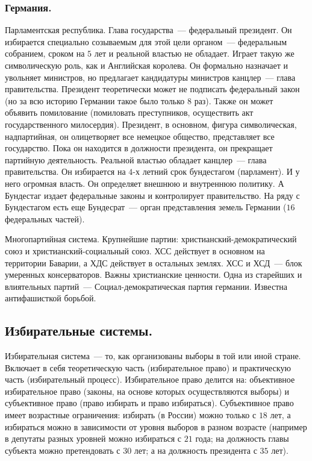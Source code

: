 \documentclass[12pt]{article}
\begin{document}
	\subsubsection{Германия.}
	\begin{note}
		Парламентская республика. Глава государства~--- федеральный президент. Он избирается специально созываемым для этой цели органом~--- федеральным собранием, сроком на $5$ лет и реальной властью не обладает. Играет такую же символическую роль, как и Английская королева. Он формально назначает и увольняет министров, но предлагает кандидатуры министров канцлер~--- глава правительства. Президент теоретически может не подписать федеральный закон (но за всю историю Германии такое было только $8$ раз). Также он может объявить помилование (помиловать преступников, осуществить акт государственного милосердия). Президент, в основном, фигура символическая, надпартийная, он олицетворяет все немецкое общество, представляет все государство. Пока он находится в должности президента, он прекращает партийную деятельность. Реальной властью обладает канцлер~--- глава правительства. Он избирается на $4$-х летний срок бундестагом (парламент). И у него огромная власть. Он определяет внешнюю и внутреннюю политику. А Бундестаг издает федеральные законы и контролирует правительство. На ряду с Бундестагом есть еще Бундесрат~--- орган представления земель Германии ($16$ федеральных частей).
	\end{note}
	\begin{note}
		Многопартийная система. Крупнейшие партии: христианский-демократический союз и христианский-социальный союз. ХСС действует в основном на территории Баварии, а ХДС действует в остальных землях. ХСС и ХСД~--- блок умеренных консерваторов. Важны христианские ценности. Одна из старейших и влиятельных партий~--- Социал-демократическая партия германии. Известна антифашисткой борьбой.
	\end{note}
	\subsection{Избирательные системы.}
	\begin{definition}
		Избирательная система~--- то, как организованы выборы в той или иной стране. Включает в себя теоретическую часть (избирательное право) и практическую часть (избирательный процесс). Избирательное право делится на: объективное избирательное право (законы, на основе которых осуществляются выборы) и субъективное право (право избирать и право избираться). Субъективное право имеет возрастные ограничения: избирать (в России) можно только с $18$ лет, а избираться можно в зависимости от уровня выборов в разном возрасте (например в депутаты разных уровней можно избираться с $21$ года; на должность главы субъекта можно претендовать с $30$ лет; а на должность президента с $35$ лет).
	\end{definition}
\end{document}
